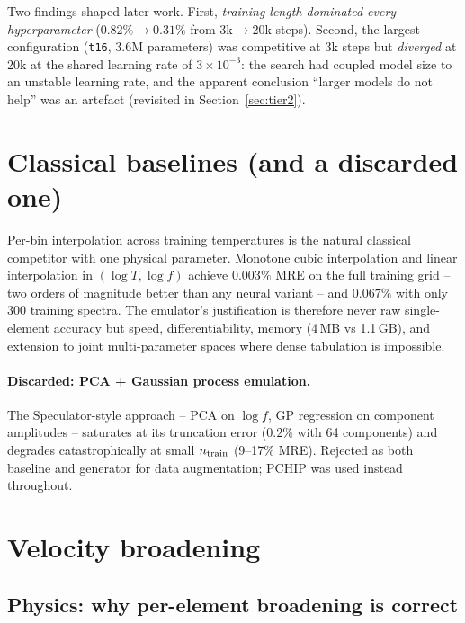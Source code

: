 \documentclass[11pt,a4paper]{article}
\newcommand{\code}[1]{\texttt{#1}}
\begin{document}
Two findings shaped later work. First, \emph{training length dominated
every hyperparameter} ($0.82\%\to0.31\%$ from 3k$\to$20k steps).
Second, the largest configuration (\code{t16}, 3.6M parameters) was
competitive at 3k steps but \emph{diverged} at 20k at the shared
learning rate of $3\times10^{-3}$: the search had coupled model size to
an unstable learning rate, and the apparent conclusion ``larger models
do not help'' was an artefact (revisited in Section~\ref{sec:tier2}).

\section{Classical baselines (and a discarded one)}
\label{sec:baselines}

Per-bin interpolation across training temperatures is the natural
classical competitor with one physical parameter. Monotone cubic
interpolation \citep[PCHIP;][]{fritsch80} and linear interpolation in
$(\log T,\log f)$ achieve $0.003\%$ MRE on the full training grid --
two orders of magnitude better than any neural variant -- and $0.067\%$
with only 300 training spectra. The emulator's justification is
therefore never raw single-element accuracy but speed, differentiability,
memory (4\,MB vs 1.1\,GB), and extension to joint multi-parameter
spaces where dense tabulation is impossible.

\paragraph{Discarded: PCA + Gaussian process emulation.} The
Speculator-style approach \citep{alsing20} -- PCA on $\log f$, GP
regression on component amplitudes -- saturates at its truncation error
($0.2\%$ with 64 components) and degrades catastrophically at small
$n_{\rm train}$ (9--17\% MRE). Rejected as both baseline and generator
for data augmentation; PCHIP was used instead throughout.

\section{Velocity broadening}
\label{sec:broadening}

\subsection{Physics: why per-element broadening is correct}
\end{document}
